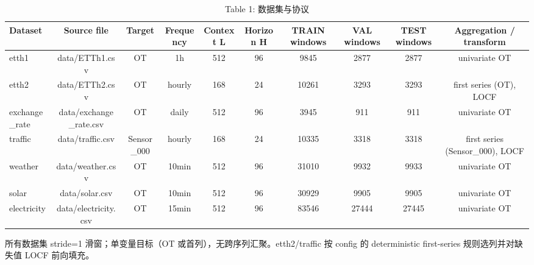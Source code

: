 \begin{table}[htbp]
  \centering
  \caption{Table 1: 数据集与协议}
  \label{tab:datasets}
  \begin{tabular}{lccccccccc}
    \toprule
    Dataset & Source file & Target & Frequency & Context L & Horizon H & TRAIN windows & VAL windows & TEST windows & Aggregation / transform \\
    \midrule
    etth1 & data/ETTh1.csv & OT & 1h & 512 & 96 & 9845 & 2877 & 2877 & univariate OT \\
    etth2 & data/ETTh2.csv & OT & hourly & 168 & 24 & 10261 & 3293 & 3293 & first series (OT), LOCF \\
    exchange\_rate & data/exchange\_rate.csv & OT & daily & 512 & 96 & 3945 & 911 & 911 & univariate OT \\
    traffic & data/traffic.csv & Sensor\_000 & hourly & 168 & 24 & 10335 & 3318 & 3318 & first series (Sensor\_000), LOCF \\
    weather & data/weather.csv & OT & 10min & 512 & 96 & 31010 & 9932 & 9933 & univariate OT \\
    solar & data/solar.csv & OT & 10min & 512 & 96 & 30929 & 9905 & 9905 & univariate OT \\
    electricity & data/electricity.csv & OT & 15min & 512 & 96 & 83546 & 27444 & 27445 & univariate OT \\
    \bottomrule
  \end{tabular}
  {\footnotesize 所有数据集 stride=1 滑窗；单变量目标（OT 或首列），无跨序列汇聚。etth2/traffic 按 config 的 deterministic first-series 规则选列并对缺失值 LOCF 前向填充。}
\end{table}
